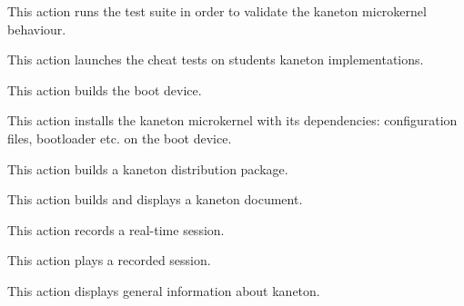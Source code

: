 	{
	  This action runs the test suite in order to validate the kaneton
	  microkernel behaviour.

	  \-

	}

	{
	  This action launches the cheat tests on students kaneton
	  implementations.

	  \-


	  \-

	}

	{
	  This action builds the boot device.

	  \-

	}

	{
	  This action installs the kaneton microkernel with its dependencies:
	  configuration files, bootloader etc. on the boot device.

	  \-

	}

	{
	  This action builds a kaneton distribution package.

	  \-


	  \-


	  \-

	}

	{
	  This action builds and displays a kaneton document.

	  \-


	  \-


	  \-

	}

	{
	  This action records a real-time session.

	  \-


	  \-

	}

	{
	  This action plays a recorded session.

	  \-


	  \-


	  \-

	}

	{
	  This action displays general information about kaneton.

	  \-

	}
